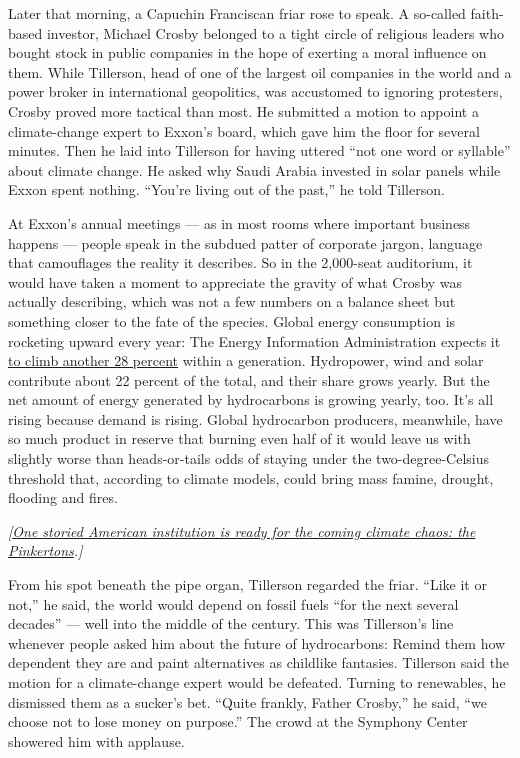 Later that morning, a Capuchin Franciscan friar rose to speak. A
so-called faith-based investor, Michael Crosby belonged to a tight
circle of religious leaders who bought stock in public companies in the
hope of exerting a moral influence on them. While Tillerson, head of one
of the largest oil companies in the world and a power broker in
international geopolitics, was accustomed to ignoring protesters, Crosby
proved more tactical than most. He submitted a motion to appoint a
climate-change expert to Exxon's board, which gave him the floor for
several minutes. Then he laid into Tillerson for having uttered ``not
one word or syllable'' about climate change. He asked why Saudi Arabia
invested in solar panels while Exxon spent nothing. ``You're living out
of the past,'' he told Tillerson.

At Exxon's annual meetings --- as in most rooms where important business
happens --- people speak in the subdued patter of corporate jargon,
language that camouflages the reality it describes. So in the 2,000-seat
auditorium, it would have taken a moment to appreciate the gravity of
what Crosby was actually describing, which was not a few numbers on a
balance sheet but something closer to the fate of the species. Global
energy consumption is rocketing upward every year: The Energy
Information Administration expects it
\href{https://www.eia.gov/todayinenergy/detail.php?id=32912}{to climb
another 28 percent} within a generation. Hydropower, wind and solar
contribute about 22 percent of the total, and their share grows yearly.
But the net amount of energy generated by hydrocarbons is growing
yearly, too. It's all rising because demand is rising. Global
hydrocarbon producers, meanwhile, have so much product in reserve that
burning even half of it would leave us with slightly worse than
heads-or-tails odds of staying under the two-degree-Celsius threshold
that, according to climate models, could bring mass famine, drought,
flooding and fires.

\emph{{[}\href{https://www.nytimes3xbfgragh.onion/interactive/2019/04/10/magazine/climate-change-pinkertons.html}{One
storied American institution is ready for the coming climate chaos: the
Pinkertons}.{]}}

From his spot beneath the pipe organ, Tillerson regarded the friar.
``Like it or not,'' he said, the world would depend on fossil fuels
``for the next several decades'' --- well into the middle of the
century. This was Tillerson's line whenever people asked him about the
future of hydrocarbons: Remind them how dependent they are and paint
alternatives as childlike fantasies. Tillerson said the motion for a
climate-change expert would be defeated. Turning to renewables, he
dismissed them as a sucker's bet. ``Quite frankly, Father Crosby,'' he
said, ``we choose not to lose money on purpose.'' The crowd at the
Symphony Center showered him with applause.

